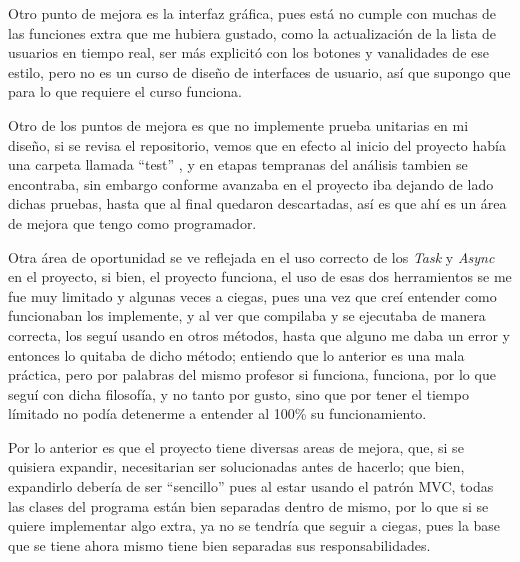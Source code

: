 \documentclass[10pt,letterpaper]{report}
\begin{document}
    \vspace{0.2 cm}
    \noindent Otro punto de mejora es la interfaz gráfica, pues está no cumple con muchas de las funciones extra que me hubiera gustado, como la actualización de la lista de usuarios en tiempo real, ser más explicitó con los botones y vanalidades de ese estilo, pero no es un curso de diseño de interfaces de usuario, así que supongo que para lo que requiere el curso funciona.

    \vspace{0.2 cm}

   \noindent  Otro de los puntos de mejora es que no implemente prueba unitarias en mi diseño, si se revisa el repositorio, vemos que en efecto al inicio del proyecto había una carpeta llamada ``test'' , y en etapas tempranas del análisis tambien se encontraba, sin embargo conforme avanzaba en el proyecto iba dejando de lado dichas pruebas, hasta que al final quedaron descartadas, así es que ahí es un área de mejora que tengo como programador.

   \vspace{0.2 cm}

  \noindent  Otra área de oportunidad se ve reflejada en el uso correcto de los \textit{Task} y \textit{Async} en el proyecto, si bien, el proyecto funciona, el uso de esas dos herramientos se me fue muy limitado y algunas veces a ciegas, pues una vez que creí entender como funcionaban los implemente, y al ver que compilaba y se ejecutaba de manera correcta, los seguí usando en otros métodos, hasta que alguno me daba un error y entonces lo quitaba de dicho método; entiendo que lo anterior es una mala práctica, pero por palabras del mismo profesor si funciona, funciona, por lo que seguí con dicha filosofía, y no tanto por gusto, sino que por tener el tiempo límitado no podía detenerme a entender al 100\% su funcionamiento.

  \vspace{0.2 cm}

  \noindent Por lo anterior es que el proyecto tiene diversas areas de mejora, que, si se quisiera expandir, necesitarian ser solucionadas antes de hacerlo; que bien, expandirlo debería de ser ``sencillo'' pues al estar usando el patrón MVC, todas las clases del programa están bien separadas dentro de mismo, por lo que si se quiere implementar algo extra, ya no se tendría que seguir a ciegas, pues la base que se tiene ahora mismo tiene bien separadas sus responsabilidades.

\vspace{0.2 cm}
    
\end{document}

